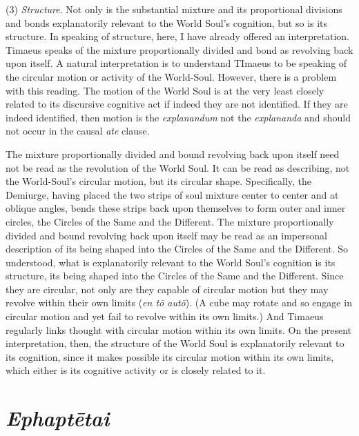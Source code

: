 (3) \emph{Structure}. Not only is the substantial mixture and its proportional divisions and bonds explanatorily relevant to the World Soul's cognition, but so is its structure. In speaking of structure, here, I have already offered an interpretation. Timaeus speaks of the mixture proportionally divided and bond as revolving back upon itself. A natural interpretation is to understand TImaeus to be speaking of the circular motion or activity of the World-Soul. However, there is a problem with this reading. The motion of the World Soul is at the very least closely related to its discursive cognitive act if indeed they are not identified. If they are indeed identified, then motion is the \emph{explanandum} not the \emph{explananda} and should not occur in the causal \emph{ate} clause. 

The mixture proportionally divided and bound revolving back upon itself need not be read as the revolution of the World Soul. It can be read as describing, not the World-Soul's circular motion, but its circular shape. Specifically, the Demiurge, having placed the two strips of soul mixture center to center and at oblique angles, bends these strips back upon themselves to form outer and inner circles, the Circles of the Same and the Different. The mixture proportionally divided and bound revolving back upon itself may be read as an impersonal description of its being shaped into the Circles of the Same and the Different. So understood, what is explanatorily relevant to the World Soul's cognition is its structure, its being shaped into the Circles of the Same and the Different. Since they are circular, not only are they capable of circular motion but they may revolve within their own limits (\emph{en tō autō}). (A cube may rotate and so engage in circular motion and yet fail to revolve within its own limits.) And Timaeus regularly links thought with circular motion within its own limits. On the present interpretation, then, the structure of the World Soul is explanatorily relevant to its cognition, since it makes possible its circular motion within its own limits, which either is its cognitive activity or is closely related to it.



\section{\emph{Ephaptētai}} %
\label{sec:_emph_ephatetai}

